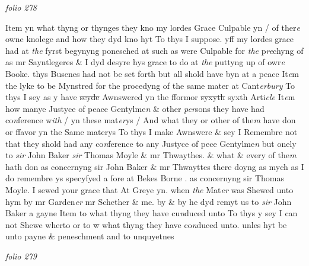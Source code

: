 \documentclass[12pt, a4paper]{book}
\begin{document}
\dotfill
					

\textit{folio 278}



				\marginpar[\vspace{0.5cm}{\textcolor{Gray}{6}}]{}
			 Item yn what thyng or thynges they kno my lordes Grace Culpable yn / of  ther\textit{e} owne knolege and how they dyd kno hyt To thys I suppose. yff my lordes grace had at \textit{the} fyrst begynyng ponesched at such as were Culpable for \textit{the} p\textit{re}chyng of as mr Sayntlegeres \& I dyd  desyre hys grace to do at \textit{the} puttyng up of owr\textit{e} Booke. thys Busenes had not be set forth but all shold have byn at a peace 
				\marginpar[\vspace{0.5cm}{\textcolor{Gray}{7}}]{}
			 It\textit{e}m the lyke to be Mynstred for the procedyng of the same mater at Cant\textit{erbury} To thys I sey as y have \sout{seyde }Awnswered yn the fformor \sout{syxyth} syxth Arti\textit{cle} 
				\marginpar[\vspace{0.5cm}{\textcolor{Gray}{8}}]{}
			 It\textit{e}m how manye Justyce of peace Gentylme\textit{n} \& other \textit{per}sons they have had co\textit{n}ference w\textit{ith} / yn these mat\textit{er}ys / And what they or other of the\textit{m} have don  or ffavor yn the Same materys To thys I make Awnswere \& sey I Remembre not that they shold had any co\textit{n}ference to any Justyce of pece Gentylme\textit{n} but onely to \textit{sir} John Baker \textit{sir} Thomas Moyle \& mr Thwaythes. \& what \& every of the\textit{m} hath don as  concernyng sir John Baker \& mr Thwayttes there doyng as mych as I do remembre ys specyfyed a fore at Bekes Borne
			. as concernyng sir Thomas Moyle. I sewed your grace that At Greye yn. when \textit{the} Mat\textit{er} was Shewed unto hym by mr Garden\textit{er} mr Schether \& me. by \& by he dyd remyt us to \textit{sir} John Baker  a gayne 
				\marginpar[\vspace{0.5cm}{\textcolor{Gray}{9}}]{}
			 Item to what thyng they have cu\textit{n}duced unto To thys y sey I can not Shewe wherto or to \sout{w} what thyng they have co\textit{n}duced unto. unles hyt be unto payne \sout{\&} peneschment and to  unquyetnes

\dotfill
					

\textit{folio 279}
\end{document}
